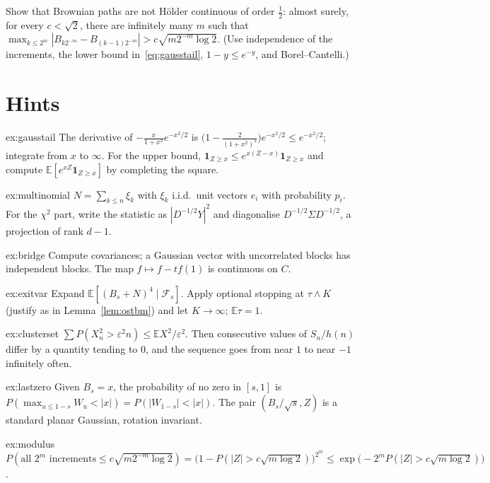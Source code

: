 \begin{exercise}[$\star\star\star$]\label{ex:modulus}
Show that Brownian paths are not H\"older continuous of order $\frac12$: almost surely, for every $c<\sqrt2$, there are infinitely many $m$ such that
$\max_{k\le2^m}|B_{k2^{-m}}-B_{(k-1)2^{-m}}|>c\sqrt{m2^{-m}\log2}$. (Use independence of the increments, the lower bound in~\eqref{eq:gausstail}, $1-y\le e^{-y}$, and
Borel--Cantelli.)
\end{exercise}

\section{Hints}

\begin{hint}{ex:gausstail}
The derivative of $-\frac x{1+x^2}e^{-x^2/2}$ is $\bigl(1-\frac2{(1+x^2)^2}\bigr)e^{-x^2/2}\le e^{-x^2/2}$; integrate from $x$ to $\infty$. For the upper bound, $\mathbf 1_{Z\ge x}\le e^{x(Z-x)}\mathbf 1_{Z\ge x}$
and compute $\mathbb E[e^{xZ}\mathbf 1_{Z\ge x}]$ by completing the square.
\end{hint}
\begin{hint}{ex:multinomial}
$N=\sum_{k\le n}\xi_k$ with $\xi_k$ i.i.d.\ unit vectors $e_i$ with probability $p_i$. For the $\chi^2$ part, write the statistic as $|D^{-1/2}Y|^2$ and diagonalise
$D^{-1/2}\Sigma D^{-1/2}$, a projection of rank $d-1$.
\end{hint}
\begin{hint}{ex:bridge}
Compute covariances; a Gaussian vector with uncorrelated blocks has independent blocks. The map $f\mapsto f-tf(1)$ is continuous on $C$.
\end{hint}
\begin{hint}{ex:exitvar}
Expand $\mathbb E[(B_s+N)^4\mid\mathcal F_s]$. Apply optional stopping at $\tau\wedge K$ (justify as in Lemma~\ref{lem:ostbm}) and let $K\to\infty$; $\mathbb E\tau=1$.
\end{hint}
\begin{hint}{ex:clusterset}
$\sum P(X_n^2>\varepsilon^2n)\le\mathbb E X^2/\varepsilon^2$. Then consecutive values of $S_n/h(n)$ differ by a quantity tending to $0$, and the sequence goes from near $1$ to near $-1$
infinitely often.
\end{hint}
\begin{hint}{ex:lastzero}
Given $B_s=x$, the probability of no zero in $[s,1]$ is $P(\max_{u\le1-s}W_u<|x|)=P(|W_{1-s}|<|x|)$. The pair $(B_s/\sqrt s,Z)$ is a standard planar Gaussian, rotation invariant.
\end{hint}
\begin{hint}{ex:modulus}
$P(\text{all }2^m\text{ increments}\le c\sqrt{m2^{-m}\log2})=\bigl(1-P(|Z|>c\sqrt{m\log2})\bigr)^{2^m}\le\exp\bigl(-2^mP(|Z|>c\sqrt{m\log2})\bigr)$.
\end{hint}

